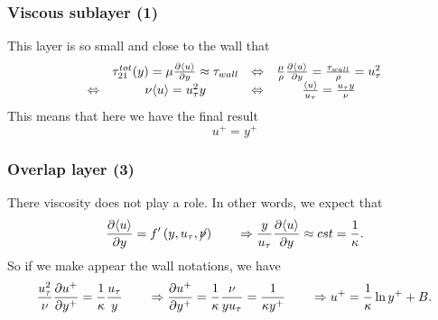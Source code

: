 		\subsubsection{Viscous sublayer (1)}
			This layer is so small and close to the wall that 	
			\begin{equation}
			\begin{array}{cccc}
				&\tau _{21} ^{tot}(y)= \mu \frac{\partial \langle u \rangle }{\partial y} \approx \tau _{wall}  &\Leftrightarrow  &\frac{\mu}{\rho}\frac{\partial \langle u \rangle }{\partial y} = \frac{\tau _{wall}}{\rho} = u_\tau ^2\\
				\Leftrightarrow &\nu \langle u \rangle = u^2_{\tau} y &\Leftrightarrow  &\frac{\langle u \rangle }{u_\tau} = \frac{u_\tau y}{\nu}
			\end{array}
			\end{equation}
			This means that here we have the final result 
			\begin{equation}
				u^+ = y^+
			\end{equation}
			
		\subsubsection{Overlap layer (3)}
			There viscosity does not play a role. In other words, we expect that 
			\begin{equation}
				\frac{\partial \langle u \rangle}{\partial y} = f'\left(y, u_\tau , \cancel{\nu}\right) \qquad \Rightarrow \frac{y}{u_\tau}\frac{\partial \langle u \rangle}{\partial y} \approx cst = \frac{1}{\kappa}.
			\end{equation}
			So if we make appear the wall notations, we have
			\begin{equation}
				\frac{u_\tau^2}{\nu}\frac{\partial u^+ }{\partial y^+} = \frac{1}{\kappa}  \frac{u_\tau}{y} \qquad\Rightarrow \frac{\partial  u^+}{\partial y^+} = \frac{1}{\kappa}\frac{\nu}{yu_\tau} = \frac{1}{\kappa y^+} \qquad \Rightarrow u^+ = \frac{1}{\kappa}\ln y^+ + B.
				\label{eq:4.37}
			\end{equation}
						
